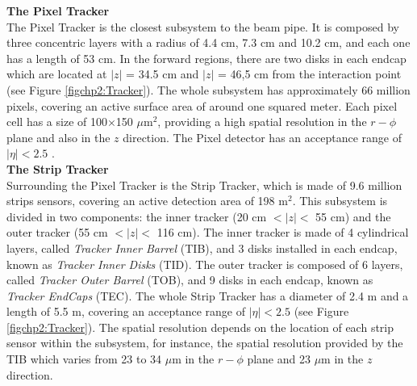 
\textbf{The Pixel Tracker}\\

\noindent The Pixel Tracker is the closest subsystem to the beam pipe. It is 
composed by three concentric layers with a radius of 4.4 cm, 7.3 cm and 10.2 cm, and each one has a length of 53 cm. In 
the forward regions, there are two disks in each endcap which are located at $|z|$ = 34.5 cm and $|z|$ =  46,5 cm from 
the interaction point (see Figure \ref{figchp2:Tracker}). The whole subsystem has 
approximately 66 million pixels, covering an active surface area of around
one squared meter. Each pixel cell has a size of 100$\times$150 $\mu$m$^{2}$, providing a high 
spatial resolution in the $r-\phi$ plane and also in the $z$ direction. The Pixel detector has 
an acceptance range of $|\eta| < 2.5$ \cite{chp2:CMS}.\\


\textbf{The Strip Tracker} \\

\noindent Surrounding the Pixel Tracker is the Strip Tracker, which is made of 9.6 million strips sensors,
covering an active detection area of 198 m$^{2}$. This subsystem is divided in two 
components: the inner tracker (20 cm $< |z| <$ 55 cm) and the outer 
tracker (55 cm $< |z| <$ 116 cm). The inner tracker
is made of 4 cylindrical layers, called \textit{Tracker Inner Barrel} (TIB), and 3 disks
installed in each endcap, known as \textit{Tracker Inner Disks} (TID). The outer tracker
is composed of 6 layers, called \textit{Tracker Outer Barrel} (TOB), and 9 disks in each 
endcap, known as \textit{Tracker EndCaps} (TEC). The whole Strip Tracker has 
a diameter of 2.4 m and a length of 5.5 m, covering an acceptance range 
of $|\eta| < 2.5$ (see Figure \ref{figchp2:Tracker}). The spatial resolution depends 
on the location of each strip sensor within the subsystem, for instance, the spatial 
resolution provided by the TIB which varies from 23 to 34 $\mu$m in the $r-\phi$ plane and 23 $\mu$m in 
the $z$ direction. \\

